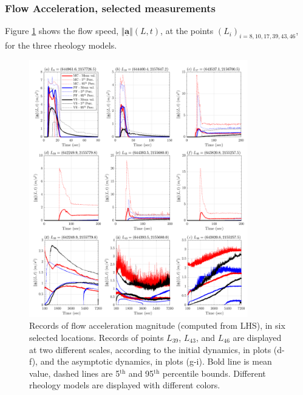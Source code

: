 \documentclass{article}
\begin{document}
\subsubsection{Flow Acceleration, selected measurements}
Figure \ref{fig:Colima-Accel1} shows the flow speed, $\Vert \underline{\mathbf{a}} \Vert(L,t)$, at the points $(L_i)_{i=8,10,17,39,43,46}$, for the three rheology models.
\begin{figure}[H]
         \centering
        \includegraphics[width=0.85\textwidth]{BAF_VolcanDeColima/LocalMeasurments/Acceleration12.png}
        \caption{Records of flow acceleration magnitude (computed from LHS), in six selected locations. Records of points $L_{39}$, $L_{43}$, and $L_{46}$ are displayed at two different scales, according to the initial dynamics, in plots (d-f), and the asymptotic dynamics, in plots (g-i). Bold line is mean value, dashed lines are 5$^{\mathrm{th}}$ and 95$^{\mathrm{th}}$ percentile bounds. Different rheology models are displayed with different colors.}
        \label{fig:Colima-Accel1}
\end{figure}
\end{document}
